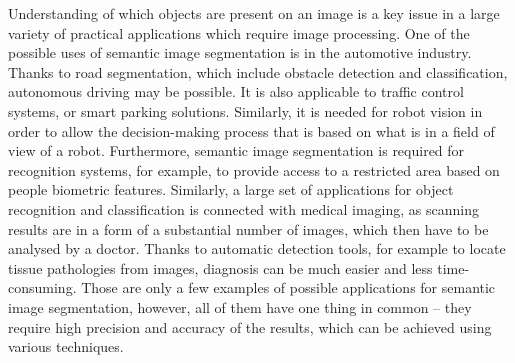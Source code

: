 \newpage
Understanding of which objects are present on an image is a key issue in a large variety of practical applications which require image processing. One of the possible uses of semantic image segmentation is in the automotive industry. Thanks to road segmentation, which include obstacle detection and classification, autonomous driving may be possible. It is also applicable to traffic control systems, or smart parking solutions. Similarly, it is needed for robot vision in order to allow the decision-making process that is based on what is in a field of view of a robot.  Furthermore, semantic image segmentation is required for recognition systems, for example, to provide access to a restricted area based on people biometric features. Similarly, a large set of applications for object recognition and classification is connected with medical imaging, as scanning results are in a form of a substantial number of images, which then have to be analysed by a doctor. Thanks to automatic detection tools, for example to locate tissue pathologies from images, diagnosis can be much easier and less time-consuming. Those are only a few examples of possible applications for semantic image segmentation, however, all of them have one thing in common – they require high precision and accuracy of the results, which can be achieved using various techniques. 
 
